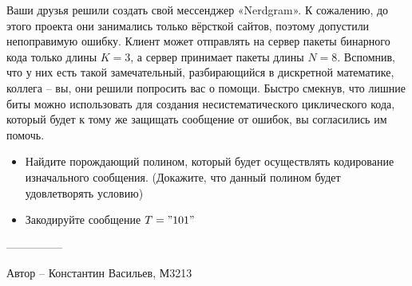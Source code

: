 \question
Ваши друзья решили создать свой мессенджер «Nerdgram». К сожалению, до этого проекта они занимались только вёрсткой сайтов, поэтому допустили непоправимую ошибку. Клиент может отправлять на сервер пакеты бинарного кода только длины $K = 3$, а сервер принимает пакеты длины $N = 8$. Вспомнив, что у них есть такой замечательный, разбирающийся в дискретной математике, коллега -- вы, они решили попросить вас о помощи. Быстро смекнув, что лишние биты можно использовать для создания несистематического циклического кода, который будет к тому же защищать сообщение от ошибок, вы согласились им помочь.
\begin{itemize}
\item Найдите порождающий полином, который будет осуществлять кодирование изначального сообщения. (Докажите, что данный полином будет удовлетворять условию)
\item Закодируйте сообщение $T = "101"$
\end{itemize}

---------------

Автор -- Константин Васильев, М3213